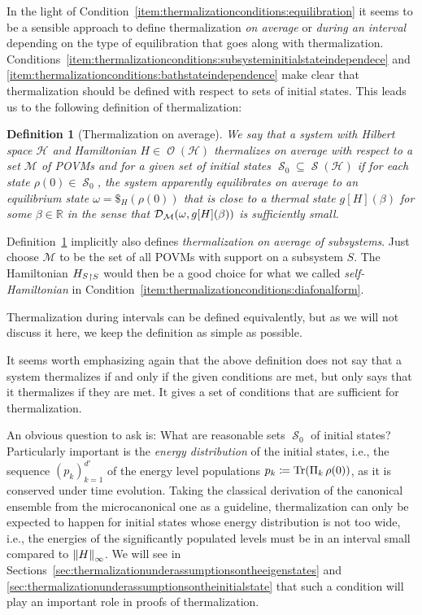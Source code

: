 \documentclass[a4paper,12pt,listof=totoc,index=totoc,bibliography=totoc,headsepline=false,headings=normal,BCOR16.153846mm,DIV12,headinclude,twoside,cleardoublepage=empty,numbers=noenddot,final]{scrreprt}
\theoremstyle{mystyle}
\numberwithin{equation}{section}
\numberwithin{figure}{section}
\numberwithin{lemma}{section}
\numberwithin{theorem}{section}
\numberwithin{corollary}{section}
\newtheorem{definition}{Definition}
\numberwithin{definition}{section}
\numberwithin{conjecture}{section}
\numberwithin{observation}{section}
\newcommand{\+}{\mkern2mu}
\newcommand{\coloneqq}{\mathrel{\vcentcolon\mkern-1.2mu=}} %
\renewcommand{\H}{H}
\newcommand{\rhog}{g}
\newcommand{\norm}[2][]{
  \ifthenelse{\equal{#1}{}}
    {\left\| {#2} \right\|}
    {\ifthenelse{\equal{#1}{uinv}}
      {\left\vert\kern-0.25ex\left\vert\kern-0.25ex\left\vert {#2} \right\vert\kern-0.25ex\right\vert\kern-0.25ex\right\vert}
      {\left\| {#2} \right\|_{#1}}
    }
}
\newcommand{\tracedistance}[3][]{
  \ifthenelse{\equal{#2}{}}
  {\ifthenelse{\equal{#3}{}}
    {\mathcal{D}_{#1}}{}
  }{
    \ifthenelse{\equal{#1}{}}
    {\operatorname{\mathcal{D}}(#2,#3)}
    {\operatorname{\mathcal{D}}_{#1}(#2,#3)}
  }
}
\newcommand{\trunc}[2]{{#1}_{\upharpoonright \mathnormal{#2}}}
\DeclareMathOperator{\1}{\mathds{1}}
\newcommand{\POVMs}{\mathcal{M}}
\DeclareMathOperator{\Obs}{\mathcal{O}}
\DeclareMathOperator{\Qst}{\mathcal{S}}
\DeclareMathOperator{\Tr}{Tr}
\newcommand{\mc}[1]{\mathcal{#1}}
\newcommand{\mcH}{\mc{H}}
\newcommand{\mb}[1]{\mathbb{#1}}
\newcommand{\R}{\mb{R}}
\begin{document}
In the light of Condition~\ref{item:thermalizationconditions:equilibration} it seems to be a sensible approach to define thermalization \emph{on average} or \emph{during an interval} depending on the type of equilibration that goes along with thermalization.
Conditions~\ref{item:thermalizationconditions:subsysteminitialstateindependece} and \ref{item:thermalizationconditions:bathstateindependence} make clear that thermalization should be defined with respect to sets of initial states.
This leads us to the following definition of thermalization:
\begin{definition}[Thermalization on average] \label{def:thermlaizationonaverage}
  We say that a system with Hilbert space $\mcH$ and Hamiltonian $\H \in \Obs(\mcH)$ \emph{thermalizes} on average with respect to a set $\POVMs$ of POVMs and for a given set of initial states $\Qst_0 \subseteq \Qst(\mcH)$ if for each state $\rho(0) \in \Qst_0$, the system apparently equilibrates on average to an equilibrium state $\omega = \$_\H(\rho(0))$ that is close to a thermal state $\rhog[\H](\beta)$ for some $\beta \in \R$ in the sense that $\tracedistance[\POVMs]{\omega}{\rhog[\H](\beta)}$ is sufficiently small.
\end{definition}

Definition~\ref{def:thermlaizationonaverage} implicitly also defines \emph{thermalization on average of subsystems}.
Just choose $\POVMs$ to be the set of all POVMs with support on a subsystem $S$.
The Hamiltonian $\trunc {\H_S} S$ would then be a good choice for what we called \emph{self-Hamiltonian} in Condition~\ref{item:thermalizationconditions:diafonalform}.

Thermalization during intervals can be defined equivalently, but as we will not discuss it here, we keep the definition as simple as possible.

It seems worth emphasizing again that the above definition does not say that a system thermalizes if and only if the given conditions are met, but only says that it thermalizes if they are met.
It gives a set of conditions that are sufficient for thermalization.

An obvious question to ask is:
What are reasonable sets $\Qst_0$ of initial states?
Particularly important is the \emph{energy distribution} of the initial states, i.e., the sequence $(p_k)_{k=1}^{d'}$ of the energy level populations $p_k \coloneqq \Tr(\Pi_k\,\rho(0))$, as it is conserved under time evolution.
Taking the classical derivation of the canonical ensemble from the microcanonical one as a guideline, thermalization can only be expected to happen for initial states whose energy distribution is not too wide, i.e., the energies of the significantly populated levels must be in an interval small compared to $\norm[\infty]\H$.
We will see in Sections~\ref{sec:thermalizationunderassumptionsontheeigenstates} and \ref{sec:thermalizationunderassumptionsontheinitialstate} that such a condition will play an important role in proofs of thermalization.
\end{document}
